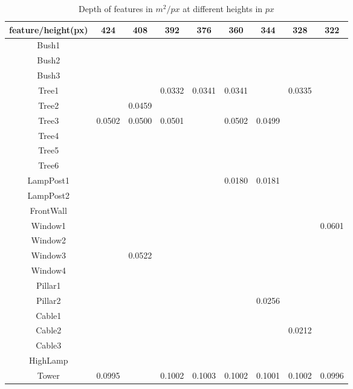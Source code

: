 \begin{table}[!htb]
\centering
    \begin{tabular}{| c | c | c | c | c | c | c | c | c |}
    \hline
    feature/height(px) & 424 & 408 & 392 & 376 & 360 & 344 & 328 & 322\\ \hline
		 Bush1 &   &   &  &  &  &  &  & \\ \hline
		 Bush2 &  &  &  &  &  &  &  & \\ \hline	
		 Bush3 &  &  &  &  &  &  &  & \\ \hline	
		 Tree1 &  &  & 0.0332 & 0.0341 & 0.0341 &  & 0.0335 & \\ \hline	
		 Tree2 &  & 0.0459 &  &  &  &  &  & \\ \hline	
		 Tree3 & 0.0502 & 0.0500 & 0.0501 &  & 0.0502 & 0.0499 &  & \\ \hline	
		 Tree4 &  &  &  &  &  &  &  & \\ \hline	
		 Tree5 &  &  &  &  &  &  &  & \\ \hline	
		 Tree6 &  &  &  &  &  &  &  & \\ \hline	
     LampPost1 &  &  &  &  & 0.0180 & 0.0181 &  & \\ \hline
		 LampPost2 &  &  &  &  &  &  &  & \\ \hline
		 FrontWall &  &  &  &  &  &  &  & \\ \hline
		 Window1 &  &  &  &  &  &  &  & 0.0601\\ \hline
		 Window2 &  &  &  &  &  &  &  & \\ \hline
		 Window3 &  & 0.0522 &  &  &  &  &  & \\ \hline
		 Window4 &  &  &  &  &  &  &  & \\ \hline
		 Pillar1 &  &  &  &  &  &  &  & \\ \hline
		 Pillar2 &  &  &  &  &  & 0.0256 &  & \\ \hline
		 Cable1 &  &  &  &  &  &  & & \\ \hline
	   Cable2 &  &  &  &  &  &  & 0.0212 & \\ \hline
	   Cable3 &  &  &  &  &  &  &  & \\ \hline
		 HighLamp &  &  &  &  &  &  &  & \\ \hline
	   Tower & 0.0995 &  & 0.1002  & 0.1003  & 0.1002 & 0.1001 & 0.1002 & 0.0996 \\ \hline
    \end{tabular}
		\caption{Depth of features in $m^2/px$ at different heights in $px$}\label{table3}
\end{table}

